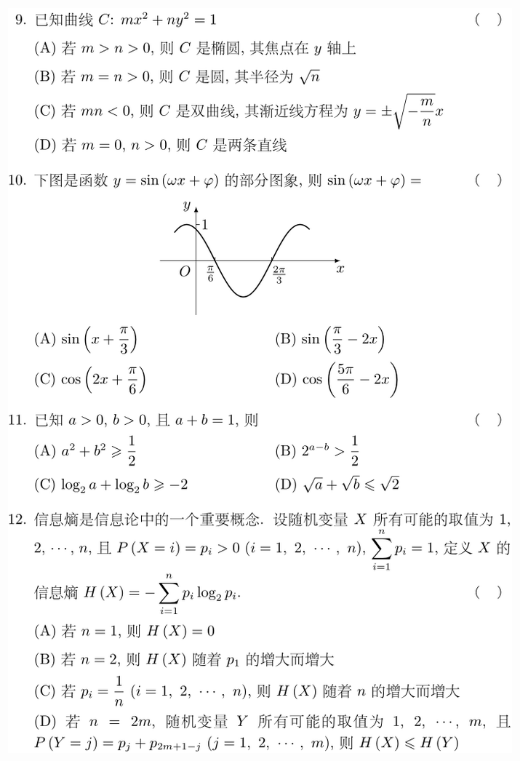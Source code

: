 \documentclass[11pt,a4paper]{ctexart}
\begin{document}
\begin{paracol}{2}
\includegraphics[width=\linewidth]{figure02.png}
\newpage
{}


\end{paracol}
\end{document}
